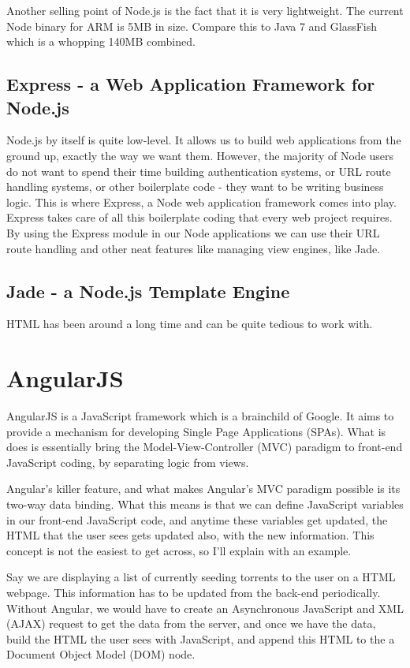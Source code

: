 Another selling point of Node.js is the fact that it is very lightweight. The current Node binary for ARM is 5MB in size. Compare this to Java 7 and GlassFish which is a whopping 140MB combined.


\subsection{Express - a Web Application Framework for Node.js}
Node.js by itself is quite low-level. It allows us to build web applications from the ground up, exactly the way we want them. However, the majority of Node users do not want to spend their time building authentication systems, or URL route handling systems, or other boilerplate code - they want to be writing business logic. This is where Express, a Node web application framework comes into play. Express takes care of all this boilerplate coding that every web project requires. By using the Express module in our Node applications we can use their URL route handling and other neat features like managing view engines, like Jade.


\subsection{Jade - a Node.js Template Engine}
HTML has been around a long time and can be quite tedious to work with. 



\section{AngularJS}
AngularJS is a JavaScript framework which is a brainchild of Google. It aims to provide a mechanism for developing Single Page Applications (SPAs). What is does is essentially bring the Model-View-Controller (MVC) paradigm to front-end JavaScript coding, by separating logic from views.

Angular's killer feature, and what makes Angular's MVC paradigm possible is its two-way data binding. What this means is that we can define JavaScript variables in our front-end JavaScript code, and anytime these variables get updated, the HTML that the user sees gets updated also, with the new information. This concept is not the easiest to get across, so I'll explain with an example.

Say we are displaying a list of currently seeding torrents to the user on a HTML webpage. This information has to be updated from the back-end periodically. Without Angular, we would have to create an Asynchronous JavaScript and XML (AJAX) request to get the data from the server, and once we have the data, build the HTML the user sees with JavaScript, and append this HTML to the a Document Object Model (DOM) node.

